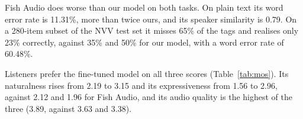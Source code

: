 \documentclass{article} %
\begin{document}
Fish Audio does worse than our model on both tasks. On plain text its word
error rate is 11.31\%, more than twice ours, and its speaker similarity is 0.79. On a 280-item
subset of the NVV test set it misses 65\% of the tags and realises only 23\% correctly, against
35\% and 50\% for our model, with a word error rate of 60.48\%.

Listeners prefer the fine-tuned model on all three scores (Table~\ref{tab:mos}). Its
naturalness rises from 2.19 to 3.15 and its expressiveness from 1.56 to 2.96, against 2.12 and
1.96 for Fish Audio, and its audio quality is the highest of the three (3.89, against 3.63 and
3.38).

\begin{table}[H]
\caption{Zero-shot Vietnamese TTS on plain text, without NVV tags. Every system is evaluated on
the same 238 utterances sampled from our internal VietVoice dataset. WER is in \%. Fish Audio
is queried through an API served with vLLM, not run as a local model, so its RTF is not
measured.}
\label{tab:zeroshot}
\centering

\end{table}

\begin{table}[H]
\caption{Vietnamese NVV synthesis, over all 2,940 tagged items (14 classes). The two OmniVoice
models get the same tagged input, so for 12 of the 14 classes the base model sees tags it was
never trained on. Fish Audio is evaluated on a 280-item subset, through an API served with
vLLM, so its RTF is not measured. WER is in \%.}
\label{tab:para}
\centering

\end{table}

\begin{table}[H]
\caption{Listening test on NVV synthesis, on a 1--5 scale with 95\% confidence intervals.
MOS-Q: audio quality; MOS-N: naturalness; MOS-E: expressiveness.}
\label{tab:mos}
\centering

\end{table}
\end{document}
